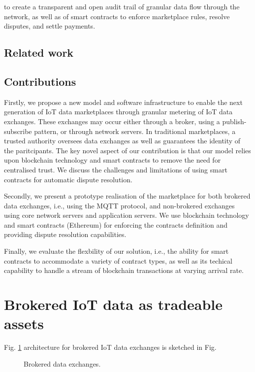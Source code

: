 \documentclass[conference]{IEEEtran}
\begin{document}
to create a transparent and open audit trail of granular data flow through the network, as well as of smart contracts to enforce marketplace rules, resolve disputes, and settle payments.

\subsection{Related work}


\subsection{Contributions}

Firstly, we propose a new model and software infrastructure to enable the next generation of IoT data marketplaces through granular metering of IoT data exchanges. These exchanges may occur either through a broker, using a publish-subscribe pattern, or through network servers.
In traditional marketplaces, a trusted authority oversees data exchanges as well as guarantees the identity of the paritcipants. The key novel aspect of our contribution is that our model relies upon blockchain technology and smart contracts to remove the need for centralised trust. We discuss the challenges and limitations of using smart contracts for automatic dispute resolution.

Secondly, we present a prototype realisation of the marketplace for both brokered data exchanges, i.e., using the MQTT protocol, and non-brokered exchanges using core network servers and application servers. We use blockchain technology and smart contracts (Ethereum) for enforcing the contracts definition and providing dispute resolution capabilities.

Finally, we evaluate the flexbility of our solution, i.e., the ability for smart contracts to accommodate a variety of contract types, as well as its techical capability to handle a stream of blockchain transactions at varying arrival rate.

\section{Brokered IoT data as tradeable assets}

Fig. \ref{fig:reference-architecture} architecture for brokered IoT data exchanges is sketched in Fig. 

\begin{figure}
\caption{Brokered data exchanges.}
\label{fig:reference-architecture}
\end{figure}
\end{document}
